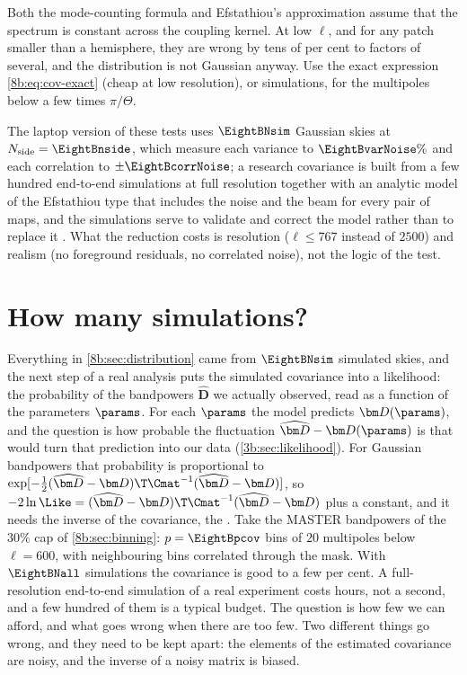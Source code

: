 \begin{pitfall}
Both the mode-counting formula and Efstathiou's approximation assume that the spectrum is constant
across the coupling kernel. At low $\ell$, and for any patch smaller than a hemisphere, they are wrong
by tens of per cent to factors of several, and the distribution is not Gaussian anyway. Use the exact
expression \eqref{8b:eq:cov-exact} (cheap at low resolution), or simulations, for the multipoles
below a few times $\pi/\Theta$.
\end{pitfall}

The laptop version of these tests uses $\EightBNsim$ Gaussian skies at $N_{\rm side}=\EightBnside$, which measure each
variance to $\EightBvarNoise\%$ and each correlation to $\pm\EightBcorrNoise$; a research covariance is built from a few
hundred end-to-end simulations at full resolution together with an analytic model of the
Efstathiou type that includes the noise and the beam for every pair of maps, and the simulations
serve to validate and correct the model rather than to replace it \cite{Planck2018V}. What the
reduction costs is resolution ($\ell\le767$ instead of $2500$) and realism (no foreground residuals, no
correlated noise), not the logic of the test.
\section{How many simulations?}
\label{8b:sec:nsims}

Everything in \cref{8b:sec:distribution} came from $\EightBNsim$ simulated skies, and the next step of a
real analysis puts the simulated covariance into a likelihood: the probability of the bandpowers
$\widehat{\bm D}$ we actually observed, read as a function of the parameters $\params$. For each $\params$ the model
predicts $\bm D(\params)$, and the question is how probable the fluctuation $\widehat{\bm D}-\bm D(\params)$ is that would turn
that prediction into our data (\cref{3b:sec:likelihood}). For Gaussian bandpowers that probability is
proportional to $\exp[-\frac12(\widehat{\bm D}-\bm D)\T\Cmat^{-1}(\widehat{\bm D}-\bm D)]$, so
$-2\ln\Like=(\widehat{\bm D}-\bm D)\T\Cmat^{-1}(\widehat{\bm D}-\bm D)$ plus a constant, and it needs the inverse of
the covariance, the . Take the MASTER bandpowers of the $30\%$ cap of
\cref{8b:sec:binning}: $p=\EightBpcov$ bins of $20$ multipoles below $\ell=600$, with neighbouring bins
correlated through the mask. With $\EightBNall$ simulations the covariance is good to a few per cent.
A full-resolution end-to-end simulation of a real experiment costs hours, not a second, and a few
hundred of them is a typical budget. The question is how few we can afford, and what goes wrong when
there are too few. Two different things go wrong, and they need to be kept apart: the elements of
the estimated covariance are noisy, and the inverse of a noisy matrix is biased.


